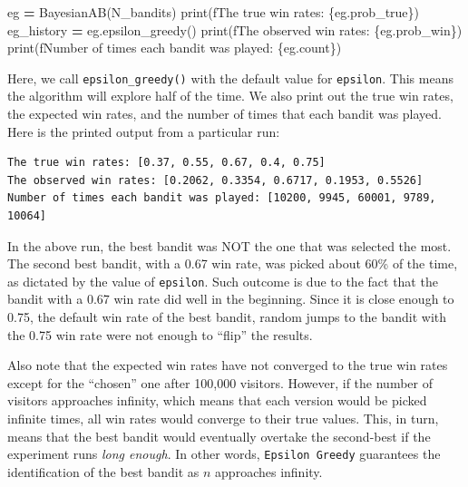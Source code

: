\documentclass[
]{book}
\newenvironment{Shaded}{\begin{snugshade}}{\end{snugshade}}
\newcommand{\BuiltInTok}[1]{#1}
\newcommand{\NormalTok}[1]{#1}
\newcommand{\OperatorTok}[1]{\textcolor[rgb]{0.81,0.36,0.00}{\textbf{#1}}}
\newcommand{\SpecialCharTok}[1]{\textcolor[rgb]{0.00,0.00,0.00}{#1}}
\newcommand{\SpecialStringTok}[1]{\textcolor[rgb]{0.31,0.60,0.02}{#1}}
\theoremstyle{definition}
\theoremstyle{definition}
\theoremstyle{definition}
\theoremstyle{definition}
\theoremstyle{remark}
\begin{document}
\begin{Shaded}
\begin{Highlighting}[]
\NormalTok{eg }\OperatorTok{=}\NormalTok{ BayesianAB(N\_bandits)}
\BuiltInTok{print}\NormalTok{(}\SpecialStringTok{f\textquotesingle{}The true win rates: }\SpecialCharTok{\{}\NormalTok{eg}\SpecialCharTok{.}\NormalTok{prob\_true}\SpecialCharTok{\}}\SpecialStringTok{\textquotesingle{}}\NormalTok{)}
\NormalTok{eg\_history }\OperatorTok{=}\NormalTok{ eg.epsilon\_greedy()}
\BuiltInTok{print}\NormalTok{(}\SpecialStringTok{f\textquotesingle{}The observed win rates: }\SpecialCharTok{\{}\NormalTok{eg}\SpecialCharTok{.}\NormalTok{prob\_win}\SpecialCharTok{\}}\SpecialStringTok{\textquotesingle{}}\NormalTok{)}
\BuiltInTok{print}\NormalTok{(}\SpecialStringTok{f\textquotesingle{}Number of times each bandit was played: }\SpecialCharTok{\{}\NormalTok{eg}\SpecialCharTok{.}\NormalTok{count}\SpecialCharTok{\}}\SpecialStringTok{\textquotesingle{}}\NormalTok{)}
\end{Highlighting}
\end{Shaded}

Here, we call \texttt{epsilon\_greedy()} with the default value for \texttt{epsilon}. This means the algorithm will explore half of the time. We also print out the true win rates, the expected win rates, and the number of times that each bandit was played. Here is the printed output from a particular run:

\begin{verbatim}
The true win rates: [0.37, 0.55, 0.67, 0.4, 0.75]
The observed win rates: [0.2062, 0.3354, 0.6717, 0.1953, 0.5526]
Number of times each bandit was played: [10200, 9945, 60001, 9789, 10064]
\end{verbatim}

In the above run, the best bandit was NOT the one that was selected the most. The second best bandit, with a 0.67 win rate, was picked about 60\% of the time, as dictated by the value of \texttt{epsilon}. Such outcome is due to the fact that the bandit with a 0.67 win rate did well in the beginning. Since it is close enough to 0.75, the default win rate of the best bandit, random jumps to the bandit with the 0.75 win rate were not enough to ``flip'' the results.

Also note that the expected win rates have not converged to the true win rates except for the ``chosen'' one after 100,000 visitors. However, if the number of visitors approaches infinity, which means that each version would be picked infinite times, all win rates would converge to their true values. This, in turn, means that the best bandit would eventually overtake the second-best if the experiment runs \emph{long enough}. In other words, \texttt{Epsilon\ Greedy} guarantees the identification of the best bandit as \(n\) approaches infinity.
\end{document}
